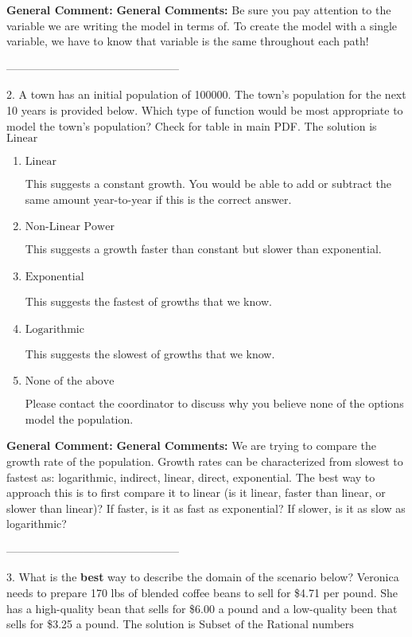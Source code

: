 \documentclass{extbook}[14pt]
\begin{document}
\textbf{General Comment:} \textbf{General Comments:} Be sure you pay attention to the variable we are writing the model in terms of. To create the model with a single variable, we have to know that variable is the same throughout each path! 

-----------------------------------------------

2. A town has an initial population of 100000. The town's population for the next 10 years is provided below. Which type of function would be most appropriate to model the town's population?
Check for table in main PDF. 
The solution is $ \text{Linear} $ 

\begin{enumerate}[label=\Alph*.] 
\item $ \text{Linear} $ 

 This suggests a constant growth. You would be able to add or subtract the same amount year-to-year if this is the correct answer. 
\item $ \text{Non-Linear Power} $ 

 This suggests a growth faster than constant but slower than exponential. 
\item $ \text{Exponential} $ 

 This suggests the fastest of growths that we know. 
\item $ \text{Logarithmic} $ 

 This suggests the slowest of growths that we know. 
\item $ \text{None of the above} $ 

 Please contact the coordinator to discuss why you believe none of the options model the population. 
\end{enumerate} 
 
\textbf{General Comment:} \textbf{General Comments:} We are trying to compare the growth rate of the population. Growth rates can be characterized from slowest to fastest as: logarithmic, indirect, linear, direct, exponential. The best way to approach this is to first compare it to linear (is it linear, faster than linear, or slower than linear)? If faster, is it as fast as exponential? If slower, is it as slow as logarithmic? 

-----------------------------------------------

3. What is the \textbf{best} way to describe the domain of the scenario below?
Veronica needs to prepare 170 lbs of blended coffee beans to sell for \$4.71 per pound. She has a high-quality bean that sells for \$6.00 a pound and a low-quality been that sells for \$3.25 a pound. 
The solution is $ \text{Subset of the Rational numbers} $ 
\end{document}

